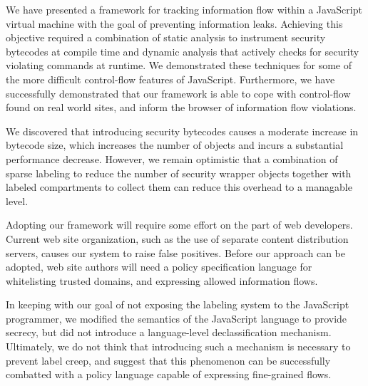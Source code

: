 \documentclass{llncs}
\begin{document}
We have presented a framework for tracking information flow within a JavaScript virtual machine with the goal of preventing information leaks.
Achieving this objective required a combination of static analysis to instrument security bytecodes at compile time and dynamic analysis that actively checks for security violating commands at runtime.
We demonstrated these techniques for some of the more difficult control-flow features of JavaScript.
Furthermore, we have successfully demonstrated that our framework is able to cope with control-flow found on real world sites, and inform the browser of information flow violations.

We discovered that introducing security bytecodes causes a moderate increase in bytecode size, which increases the number of objects and incurs a substantial performance decrease.
However, we remain optimistic that a combination of sparse labeling to reduce the number of security wrapper objects together with labeled compartments to collect them can reduce this overhead to a managable level.

Adopting our framework will require some effort on the part of web developers.
Current web site organization, such as the use of separate content distribution servers, causes our system to raise false positives.
Before our approach can be adopted, web site authors will need a policy specification language for whitelisting trusted domains, and expressing allowed information flows.

In keeping with our goal of not exposing the labeling system to the JavaScript programmer, we modified the semantics of the JavaScript language to provide secrecy, but did not introduce a language-level declassification mechanism.
Ultimately, we do not think that introducing such a mechanism is necessary to prevent label creep, and suggest that this phenomenon can be successfully combatted with a policy language capable of expressing fine-grained flows.




\end{document}
